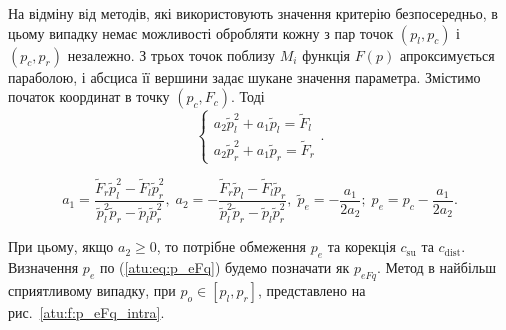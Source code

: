 \documentclass[a4paper,13pt]{atuaref}
\begin{document}
На відміну від методів, які використовують значення критерію безпосередньо, в
цьому випадку немає можливості обробляти кожну з пар точок $( p_l, p_c )$ і
$(p_c, p_r)$ незалежно. З трьох точок поблизу $ M_ {i} $ функція $ F (p) $
апроксимується параболою, і абсциса її вершини задає шукане значення параметра.
Змістимо початок координат в точку
$ ( p_c, F_c ) $. Тоді
\[
  \left\{
    \begin{array}{l}
      a_2 \tilde{p}_l^2 + a_1 \tilde{p}_l  = \tilde{F}_l
      \\
      a_2 \tilde{p}_r^2 + a_1 \tilde{p}_r  = \tilde{F}_r
    \end{array}
  \right. .
\]
%
%

\begin{equation}
   a_1 = \frac{\tilde{F}_r \tilde{p}_l^2 - \tilde{F}_l \tilde{p}_r^2 }
              { \tilde{p}_l^2 \tilde{p}_r  - \tilde{p}_l \tilde{p}_r^2 },
  \;
  a_2 = - \frac{\tilde{F}_r \tilde{p}_l - \tilde{F}_l \tilde{p}_r }
               { \tilde{p}_l^2 \tilde{p}_r  - \tilde{p}_l \tilde{p}_r^2 },
  \;
  \tilde{p}_e = - \frac{a_1}{2 a_2};
  \;
  p_e = p_c - \frac{a_1}{2 a_2}.
  \label{atu:eq:p_eFq}
\end{equation}

При цьому, якщо
$ a_2 \ge 0 $,
то потрібне обмеження $p_e$ та корекція $c_\mathrm{su}$ та $c_\mathrm{dist}$.
Визначення $ p_e $ по (\ref{atu:eq:p_eFq}) будемо позначати як $p_{eFq}$.
Метод в найбільш сприятливому випадку, при
$p_o \in [p_l,p_r]$, представлено на рис.~\ref{atu:f:p_eFq_intra}.
\end{document}

